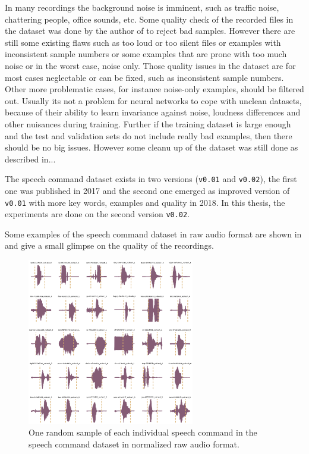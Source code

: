 In many recordings the background noise is imminent, such as traffic noise, chattering people, office sounds, etc.
Some quality check of the recorded files in the dataset was done by the author of \cite{Warden2018} to reject bad samples.
However there are still some existing flaws such as too loud or too silent files or examples with inconsistent sample numbers or some examples that are prone with too much noise or in the worst case, noise only.
Those quality issues in the dataset are for most cases neglectable or can be fixed, such as inconsistent sample numbers. 
Other more problematic cases, for instance noise-only examples, should be filtered out.
Usually its not a problem for neural networks to cope with unclean datasets, because of their ability to learn invariance against noise, loudness differences and other nuisances during training.
Further if the training dataset is large enough and the test and validation sets do not include really bad examples, then there should be no big issues.
However some cleanu up of the dataset was still done as described in...

The speech command dataset exists in two versions (\texttt{v0.01} and \texttt{v0.02}), the first one was published in 2017 and the second one emerged as improved version of \texttt{v0.01} with more key words, examples and quality in 2018.
In this thesis, the experiments are done on the second version \texttt{v0.02}.

Some examples of the speech command dataset in raw audio format are shown in  and give a small glimpse on the quality of the recordings.
\begin{figure}[!ht]
  \centering
    \includegraphics[width=0.65\textwidth]{./5_exp/figs/exp_dataset_wav_grid_c30}
  \caption{One random sample of each individual speech command in the speech command dataset in normalized raw audio format.}
  \label{fig:exp_dataset_wav_grid_c30}
\end{figure}
\FloatBarrier
\noindent

